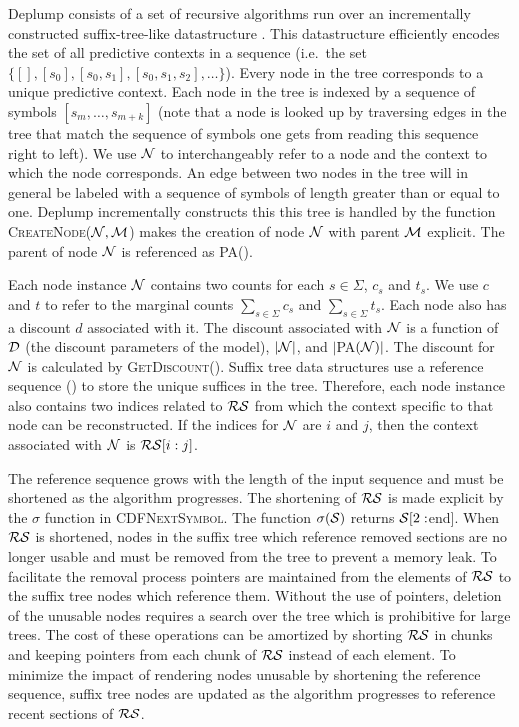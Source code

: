 Deplump consists of a set of recursive algorithms run over an incrementally constructed suffix-tree-like datastructure \citep{Ukkonen1992}.  %
This datastructure efficiently encodes the set of all predictive contexts in a sequence (i.e.~the set $\{ [ ], [s_0], [s_0,s_1], [s_0, s_1,s_2], \ldots \}$).   Every node in the tree corresponds to a unique predictive context.  Each node in the tree is indexed by a sequence of symbols $[s_m, \ldots, s_{m + k}]$ (note that a node is looked up by traversing edges in the tree that match the sequence of symbols one gets from reading this sequence right to left).  We use $\N$ to interchangeably refer to a node and the context to which the node corresponds. An edge between two nodes in the tree will in general be labeled with a sequence of symbols of length greater than or equal to one.  Deplump incrementally constructs this this tree is handled by the function \textsc{CreateNode($\N, \M$)} makes the creation of node $\N$ with parent $\M$ explicit. The parent of node $\N$ is referenced as \textsc{PA(\N)}.

Each node instance $\N$ contains two counts for each $s \in \Sigma$, $c_s$ and $t_s$.  We use $c$ and $t$ to refer to the marginal counts $\sum_{s \in \Sigma} c_s$ and $\sum_{s \in \Sigma} t_s$.  Each node also has a discount $d$ associated with it.  The discount associated with $\N$ is a function of $\D$ (the discount parameters of the model), $|\N|$, and $|$\textsc{PA}$(\N)|$.  The discount for $\N$ is calculated by \textsc{GetDiscount(\N)}. Suffix tree data structures use a reference sequence (\RS) to store the unique suffices in the tree.  Therefore, each node instance also contains two indices related to $\RS$ from which the context specific to that node can be reconstructed.  If the indices for $\N$ are $i$ and $j$, then the context associated with $\N$ is $\RS[i : j]$.

The reference sequence grows with the length of the input sequence and must be shortened as the algorithm progresses.  The shortening of $\RS$ is made explicit by the $\sigma$ function in \textsc{CDFNextSymbol}.  The function $\sigma(\Seq)$ returns $\Seq[2:$end$]$.  When $\RS$ is shortened, nodes in the suffix tree which reference removed sections are no longer usable and must be removed from the tree to prevent a memory leak.  To facilitate the removal process pointers are maintained from the elements of $\RS$ to the suffix tree nodes which reference them.  Without the use of pointers, deletion of the unusable nodes requires a search over the tree which is prohibitive for large trees. The cost of these operations can be amortized by shorting $\RS$ in chunks and keeping pointers from each chunk of $\RS$ instead of each element.  To minimize the impact of rendering nodes unusable by shortening the reference sequence, suffix tree nodes are updated as the algorithm progresses to reference recent sections of $\RS$.


